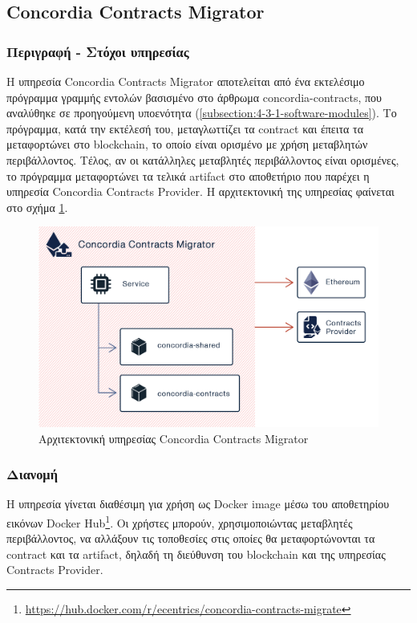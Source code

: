\subsection{Concordia Contracts Migrator} \label{subsection:4-3-3-concordia-contracts-migrator}

\subsubsection{Περιγραφή - Στόχοι υπηρεσίας}

Η υπηρεσία Concordia Contracts Migrator αποτελείται από ένα εκτελέσιμο πρόγραμμα γραμμής εντολών βασισμένο στο άρθρωμα concordia-contracts, που αναλύθηκε σε προηγούμενη υποενότητα (\ref{subsection:4-3-1-software-modules}). Το πρόγραμμα, κατά την εκτέλεσή του, μεταγλωττίζει τα contract και έπειτα τα μεταφορτώνει στο blockchain, το οποίο είναι ορισμένο με χρήση μεταβλητών περιβάλλοντος. Τέλος, αν οι κατάλληλες μεταβλητές περιβάλλοντος είναι ορισμένες, το πρόγραμμα μεταφορτώνει τα τελικά artifact στο αποθετήριο που παρέχει η υπηρεσία Concordia Contracts Provider. Η αρχιτεκτονική της υπηρεσίας φαίνεται στο σχήμα \ref{figure:4-3-concordia-contracts-migrator-architecture}.

\vspace{.5\baselineskip}

\begin{figure}[H]
    \centering
    \includegraphics[width=.75\textwidth]{assets/figures/chapter-4/4.3.architecture-4.3.3.concordia-contracts-migrator-architecture.png}
    \caption{Αρχιτεκτονική υπηρεσίας Concordia Contracts Migrator}
    \label{figure:4-3-concordia-contracts-migrator-architecture}
\end{figure}

\subsubsection{Διανομή}

Η υπηρεσία γίνεται διαθέσιμη για χρήση ως Docker image μέσω του αποθετηρίου εικόνων Docker Hub\footnote{\url{https://hub.docker.com/r/ecentrics/concordia-contracts-migrate}}. Οι χρήστες μπορούν, χρησιμοποιώντας μεταβλητές περιβάλλοντος, να αλλάξουν τις τοποθεσίες στις οποίες θα μεταφορτώνονται τα contract και τα artifact, δηλαδή τη διεύθυνση του blockchain και της υπηρεσίας Contracts Provider.